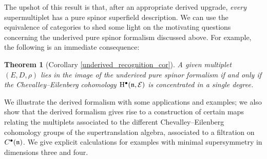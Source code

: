 \documentclass[pdftex]{sigma}
\numberwithin{equation}{section}
\newtheorem*{thm*}{Theorem}
\def\cE{\mathcal E}\def\cF{\mathcal F}\def\cG{\mathcal G}\def\cH{\mathcal H}
\def\bu{\bullet}
\begin{document}
The upshot of this result is that, after an appropriate derived upgrade, \emph{every} supermultiplet has a pure spinor superfield description.
We can use the equivalence of categories to shed some light on the motivating questions concerning the underived pure spinor formalism discussed above. For example, the following is an immediate consequence:

\begin{thm*}[Corollary \ref{underived_recognition_cor}]
	A given multiplet $(E,D,\rho)$ lies in the image of the \emph{underived} pure spinor formalism if and only if the Chevalley--Eilenberg cohomology $\mathrm H^\bullet(\fn , \cE)$ is concentrated in a single degree.
\end{thm*}

We illustrate the derived formalism with some applications and examples; we also show that the derived formalism gives rise to a construction of certain maps relating the multiplets associated to the different Chevalley--Eilenberg cohomology groups of the supertranslation algebra, associated to a filtration on $C^\bu(\fn)$. We give explicit calculations for examples with minimal supersymmetry in dimensions three and four.
\end{document}
